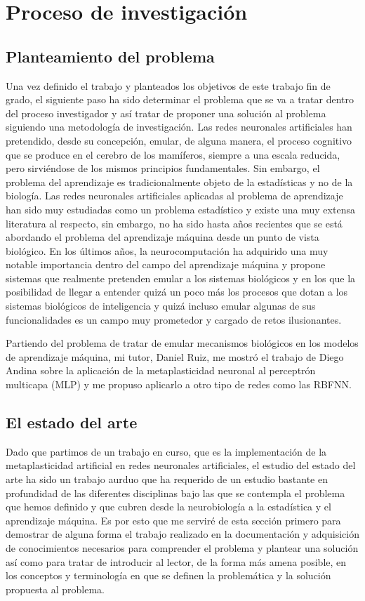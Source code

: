 \documentclass[10pt,a4paper]{report}
\begin{document}
\chapter{Proceso de investigación}
\section{Planteamiento del problema}
Una vez definido el trabajo y planteados los objetivos de este trabajo fin de grado, el siguiente paso ha sido determinar el problema que se va a tratar dentro del proceso investigador y así tratar de proponer una solución al problema siguiendo una metodología de investigación.
Las redes neuronales artificiales han pretendido, desde su concepción, emular, de alguna manera, el proceso cognitivo que se produce en el cerebro de los mamíferos, siempre a una escala reducida, pero sirviéndose de los mismos principios fundamentales. Sin embargo, el problema del aprendizaje es tradicionalmente objeto de la estadísticas y no de la biología. Las redes neuronales artificiales aplicadas al problema de aprendizaje han sido muy estudiadas como un problema estadístico y existe una muy extensa literatura al respecto, sin embargo, no ha sido hasta años recientes que se está abordando el problema del aprendizaje máquina desde un punto de vista biológico. En los últimos años, la neurocomputación ha adquirido una muy notable importancia dentro del campo del aprendizaje máquina y propone sistemas que realmente pretenden emular a los sistemas biológicos y en los que la posibilidad de llegar a entender quizá un poco más los procesos que dotan a los sistemas biológicos de inteligencia y quizá incluso emular algunas de sus funcionalidades es un campo muy prometedor y cargado de retos ilusionantes.

Partiendo del problema de tratar de emular mecanismos biológicos en los modelos de aprendizaje máquina, mi tutor, Daniel Ruiz, me mostró el trabajo de Diego Andina sobre la aplicación de la metaplasticidad neuronal al perceptrón multicapa (MLP) y me propuso aplicarlo a otro tipo de redes como las RBFNN.

\section{El estado del arte}
Dado que partimos de un trabajo en curso, que es la implementación de la metaplasticidad artificial en redes neuronales artificiales, el estudio del estado del arte ha sido un trabajo aurduo que ha requerido de un estudio bastante en profundidad de las diferentes disciplinas bajo las que se contempla el problema que hemos definido y que cubren desde la neurobiología a la estadística y el aprendizaje máquina. Es por esto que me serviré de esta sección primero para demostrar de alguna forma el trabajo realizado en la documentación y adquisición de conocimientos necesarios para comprender el problema y plantear una solución así como para tratar de introducir al lector, de la forma más amena posible, en los conceptos y terminología en que se definen la problemática y la solución propuesta al problema.
\end{document}

